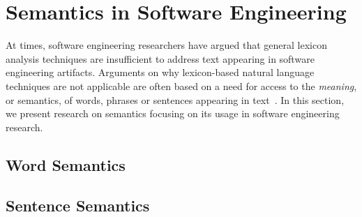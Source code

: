 

\section{Semantics in Software Engineering}
\label{cp2:artifact-semantics}






At times, software engineering researchers have argued
that general lexicon analysis techniques 
are insufficient to address text appearing in
software engineering artifacts. 
Arguments on why lexicon-based natural 
language techniques are not applicable are often based
on a need for access to the \textit{meaning}, or semantics, 
of words, phrases or sentences appearing in text~\cite{jurafsky2014speech}.
In this section, 
we present research on semantics focusing on
its usage in software engineering research.



\subsection{Word Semantics}







\subsection{Sentence Semantics}







